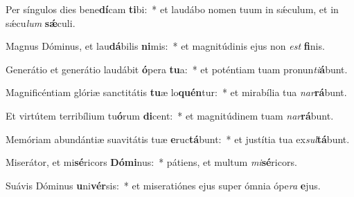 \item Per síngulos dies bene\textbf{dí}cam \textbf{ti}bi:~* et laudábo nomen tuum in sǽculum, et in sǽcu\textit{lum} \textbf{sǽ}culi.
\item Magnus Dóminus, et lau\textbf{dá}bilis \textbf{ni}mis:~* et magnitúdinis ejus non \textit{est} \textbf{fi}nis.
\item Generátio et generátio laudábit \textbf{ó}pera \textbf{tu}a:~* et poténtiam tuam pronun\textit{ti}\textbf{á}bunt.
\item Magnificéntiam glóriæ sanctitátis \textbf{tu}æ lo\textbf{quén}tur:~* et mirabília tua \textit{nar}\textbf{rá}bunt.
\item Et virtútem terribílium tu\textbf{ó}rum \textbf{di}cent:~* et magnitúdinem tuam \textit{nar}\textbf{rá}bunt.
\item Memóriam abundántiæ suavitátis tuæ \textbf{e}ruc\textbf{tá}bunt:~* et justítia tua ex\textit{sul}\textbf{tá}bunt.
\item Miserátor, et mi\textbf{sé}ricors \textbf{Dó}\textbf{mi}nus:~* pátiens, et multum \textit{mi}\textbf{sé}ricors.
\item Suávis Dóminus \textbf{u}ni\textbf{vér}sis:~* et miseratiónes ejus super ómnia ópe\textit{ra} \textbf{e}jus.
